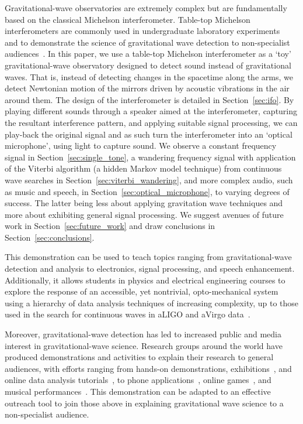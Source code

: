 \documentclass[paper-main.tex]{subfiles}
\begin{document}
Gravitational-wave observatories are extremely complex but are fundamentally based on the classical Michelson interferometer. 
Table-top Michelson interferometers are commonly used in undergraduate laboratory experiments~\cite{UgoliniEtAl:2019} and to demonstrate the science of gravitational wave detection to non-specialist audiences~\cite{ThorLabsIFO,NikhefIFO,AMIGO:online,TTExhibit:2020,LIGOIFOGlue,LIGOIFOMagnets}.
In this paper, we use a table-top Michelson interferometer as a `toy' gravitational-wave observatory designed to detect sound instead of gravitational waves. That is, instead of detecting changes in the spacetime along the arms, we detect Newtonian motion of the mirrors driven by acoustic vibrations in the air around them. 
The design of the interferometer is detailed in Section~\ref{sec:ifo}.
By playing different sounds through a speaker aimed at the interferometer, capturing the resultant interference pattern, and applying suitable signal processing, we can play-back the original signal and as such turn the interferometer into an `optical microphone', using light to capture sound.
We observe a constant frequency signal in Section~\ref{sec:single_tone}, a wandering frequency signal with application of the Viterbi algorithm (a hidden Markov model technique) from continuous wave searches in Section~\ref{sec:viterbi_wandering}, and more complex audio, such as music and speech, in Section~\ref{sec:optical_microphone}, to varying degrees of success. The latter being less about applying gravitation wave techniques and more about exhibiting general signal processing.
We suggest avenues of future work in Section~\ref{sec:future_work} and draw conclusions in Section~\ref{sec:conclusions}.


This demonstration can be used to teach topics ranging from gravitational-wave detection and analysis to electronics, signal processing, and speech enhancement. 
Additionally, it allows students in physics and electrical engineering courses to explore the response of an accessible, yet nontrivial, opto-mechanical system using a hierarchy of data analysis techniques of increasing complexity, up to those used in the search for continuous waves in aLIGO and aVirgo data~\cite{ScoX1O2Viterbi:2019,ScoX1ViterbiO1:2017,SuvorovaEtAl:2017,SuvorovaEtAl:2017}.

Moreover, gravitational-wave detection has led to increased public and media interest in gravitational-wave science. 
Research groups around the world have produced demonstrations and activities to explain their research to general audiences, with efforts ranging from hands-on demonstrations, exhibitions~\cite{TTExhibit:2020,LIGOScienceEducationCentre:online,GravityDiscoveryCentre:online}, and online data analysis tutorials~\cite{GWOSC:online,LOSC:2015}, to phone applications~\cite{LaserLabs:online,SciVR:online,chirp:online}, online games~\cite{BlackHoleHunter:online}, and musical performances~\cite{ArthurJeffesMusic:online,GravitySynthLeonTrimble:online}.%
This demonstration can be adapted to an effective outreach tool to join those above in explaining gravitational wave science to a non-specialist audience.
\end{document}
